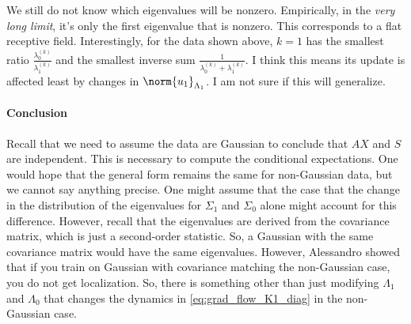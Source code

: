 \documentclass{article}
\begin{document}
We still do not know which eigenvalues will be nonzero.
Empirically, in the \emph{very long limit}, it's only the first eigenvalue that is nonzero.
This corresponds to a flat receptive field.
Interestingly, for the data shown above, $k=1$ has the smallest ratio $\frac{ \lambda_0^{(k)} }{ \lambda_1^{(k)} }$ and the smallest inverse sum $\frac{ 1 }{ \lambda_0^{(k)} + \lambda_1^{(k)} }$.
I think this means its update is affected least by changes in $\norm{ u_1 }_{\Lambda_1}$.
I am not sure if this will generalize.


\paragraph*{Conclusion}
Recall that we need to assume the data are Gaussian to conclude that $A X$ and $S$ are independent.
This is necessary to compute the conditional expectations.
One would hope that the general form remains the same for non-Gaussian data, but we cannot say anything precise.
One might assume that the case that the change in the distribution of the eigenvalues for $\Sigma_1$ and $\Sigma_0$ alone might account for this difference.
However, recall that the eigenvalues are derived from the covariance matrix, which is just a second-order statistic.
So, a Gaussian with the same covariance matrix would have the same eigenvalues.
However, Alessandro showed that if you train on Gaussian with covariance matching the non-Gaussian case, you do not get localization.
So, there is something other than just modifying $\Lambda_1$ and $\Lambda_0$ that changes the dynamics in \cref{eq:grad_flow_K1_diag} in the non-Gaussian case.
\end{document}
